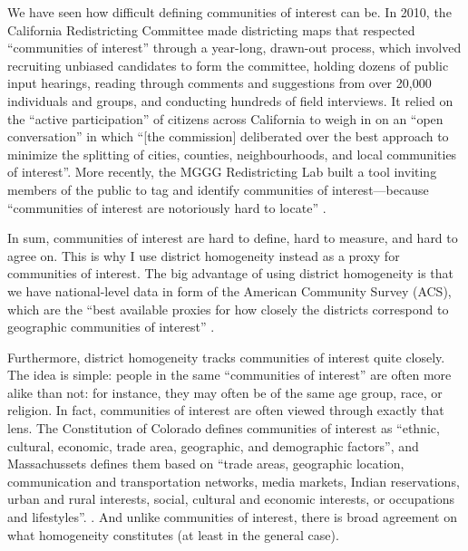 \documentclass[]{article}
\begin{document}
We have seen how difficult defining communities of interest can be. In
2010, the California Redistricting Committee made districting maps that
respected ``communities of interest'' through a year-long, drawn-out
process, which involved recruiting unbiased candidates to form the
committee, holding dozens of public input hearings, reading through
comments and suggestions from over 20,000 individuals and groups, and
conducting hundreds of field interviews. It relied on the ``active
participation'' of citizens across California to weigh in on an ``open
conversation'' in which ``{[}the commission{]} deliberated over the best
approach to minimize the splitting of cities, counties, neighbourhoods,
and local communities of interest''. More recently, the MGGG
Redistricting Lab built a tool inviting members of the public to tag and
identify communities of interest---because ``communities of interest are
notoriously hard to locate'' \citep{mggg2020}.

In sum, communities of interest are hard to define, hard to measure, and
hard to agree on. This is why I use district homogeneity instead as a
proxy for communities of interest. The big advantage of using district
homogeneity is that we have national-level data in form of the American
Community Survey (ACS), which are the ``best available proxies for how
closely the districts correspond to geographic communities of interest''
\citet[p.~283]{steph2012}.

Furthermore, district homogeneity tracks communities of interest quite
closely. The idea is simple: people in the same ``communities of
interest'' are often more alike than not: for instance, they may often
be of the same age group, race, or religion. In fact, communities of
interest are often viewed through exactly that lens. The Constitution of
Colorado defines communities of interest as ``ethnic, cultural,
economic, trade area, geographic, and demographic factors'', and
Massachussets defines them based on ``trade areas, geographic location,
communication and transportation networks, media markets, Indian
reservations, urban and rural interests, social, cultural and economic
interests, or occupations and lifestyles''. \citep{brennan}. And unlike
communities of interest, there is broad agreement on what homogeneity
constitutes (at least in the general case).
\end{document}
